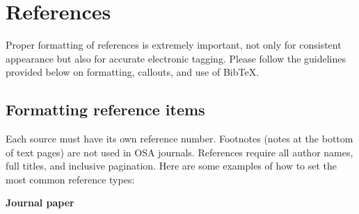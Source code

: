 \documentclass[10pt,letterpaper]{article}
\begin{document}
\section{References}
\label{sec:refs}
Proper formatting of references is extremely important, not only for consistent appearance but also for accurate electronic tagging. Please follow the guidelines provided below on formatting, callouts, and use of Bib\TeX.

\subsection{Formatting reference items}
Each source must have its own reference number. Footnotes (notes
at the bottom of text pages) are not used in OSA journals.
References require all author names, full titles, and inclusive
pagination. Here are some examples of how to set the most common
reference types:

\bigskip

\hskip8pt{\bf Journal paper}
\end{document}
